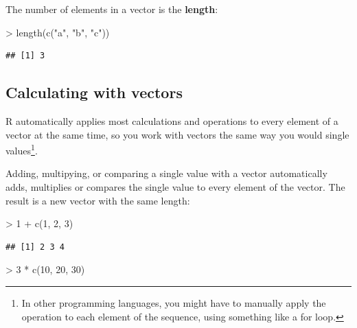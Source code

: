 \documentclass[
]{book}
\newenvironment{Shaded}{\begin{snugshade}}{\end{snugshade}}
\newcommand{\DecValTok}[1]{\textcolor[rgb]{0.00,0.00,0.81}{#1}}
\newcommand{\FunctionTok}[1]{\textcolor[rgb]{0.00,0.00,0.00}{#1}}
\newcommand{\NormalTok}[1]{#1}
\newcommand{\SpecialCharTok}[1]{\textcolor[rgb]{0.00,0.00,0.00}{#1}}
\newcommand{\StringTok}[1]{\textcolor[rgb]{0.31,0.60,0.02}{#1}}
\begin{document}
The number of elements in a vector is the \textbf{length}:

\begin{Shaded}
\begin{Highlighting}[]
\SpecialCharTok{\textgreater{}} \FunctionTok{length}\NormalTok{(}\FunctionTok{c}\NormalTok{(}\StringTok{"a"}\NormalTok{, }\StringTok{"b"}\NormalTok{, }\StringTok{"c"}\NormalTok{))}
\end{Highlighting}
\end{Shaded}

\begin{verbatim}
## [1] 3
\end{verbatim}

\hypertarget{calculating-with-vectors}{%
\subsection{Calculating with vectors}\label{calculating-with-vectors}}

R automatically applies most calculations and operations to every element
of a vector at the same time, so you work with vectors the same way
you would single values\footnote{In other programming languages, you might have to manually
  apply the operation to each element of the sequence, using something
  like a for loop.}.

Adding, multipying, or comparing a single value with a vector automatically
adds, multiplies or compares the single value to every element of the vector.
The result is a new vector with the same length:

\begin{Shaded}
\begin{Highlighting}[]
\SpecialCharTok{\textgreater{}} \DecValTok{1} \SpecialCharTok{+} \FunctionTok{c}\NormalTok{(}\DecValTok{1}\NormalTok{, }\DecValTok{2}\NormalTok{, }\DecValTok{3}\NormalTok{)}
\end{Highlighting}
\end{Shaded}

\begin{verbatim}
## [1] 2 3 4
\end{verbatim}

\begin{Shaded}
\begin{Highlighting}[]
\SpecialCharTok{\textgreater{}} \DecValTok{3} \SpecialCharTok{*} \FunctionTok{c}\NormalTok{(}\DecValTok{10}\NormalTok{, }\DecValTok{20}\NormalTok{, }\DecValTok{30}\NormalTok{)}
\end{Highlighting}
\end{Shaded}
\end{document}
